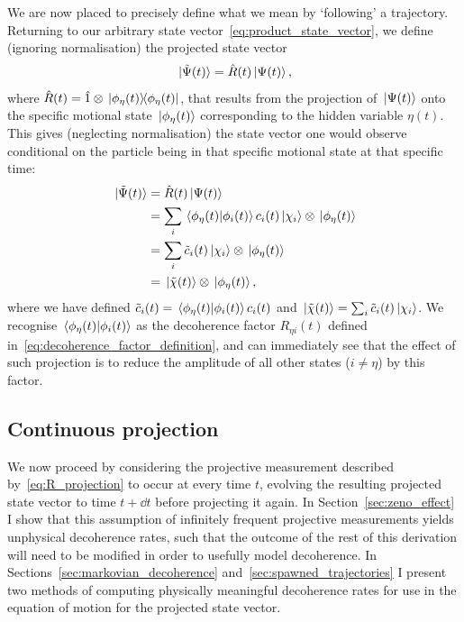 We are now placed to precisely define what we mean by `following' a trajectory.
Returning to our arbitrary state vector~\eqref{eq:product_state_vector}, we define (ignoring normalisation) the projected state vector
\begin{align}\label{eq:R_projection}
\ket{\tilde \Psi(t)} = \hat R(t)\ket{\Psi(t)},
\end{align}
where $\hat R(t) = \hat 1 \otimes \ketbra{\phi_\eta(t)}{\phi_\eta(t)}$, that results from the projection of $\ket{\Psi(t)}$ onto the specific motional state $\ket{\phi_\eta(t)}$ corresponding to the hidden variable $\eta(t)$. This gives (neglecting normalisation) the state vector one would observe conditional on the particle being in that specific motional state at that specific time:
\begin{align}
\ket{\tilde \Psi(t)} &= \hat R(t) \ket{\Psi(t)}\\
&= \sum_i\braket{\phi_\eta(t)}{\phi_i(t)}c_i(t)\ket{\chi_i}\otimes\ket{\phi_\eta(t)}\\
&= \sum_i\tilde c_i(t)\ket{\chi_i}\otimes\ket{\phi_\eta(t)}\\
&= \ket{\tilde \chi(t)}\otimes\ket{\phi_\eta(t)},
\end{align}
where we have defined $\tilde c_i(t) = \braket{\phi_\eta(t)}{\phi_i(t)}c_i(t)$ and $\ket{\tilde \chi(t)} = \sum_i \tilde c_i(t)\ket{\chi_i}$. We recognise $\braket{\phi_\eta(t)}{\phi_i(t)}$ as the decoherence factor $R_{\eta i}(t)$ defined in~\eqref{eq:decoherence_factor_definition}, and can immediately see that the effect of such projection is to reduce the amplitude of all other states ($i\neq\eta$) by this factor.

\subsection{Continuous projection}\label{sec:continuous_projection}
We now proceed by considering the projective measurement described by~\eqref{eq:R_projection} to occur at every time $t$, evolving the resulting projected state vector to time $t+\dd t$ before projecting it again. In Section~\ref{sec:zeno_effect} I show that this assumption of infinitely frequent projective measurements yields unphysical decoherence rates, such that the outcome of the rest of this derivation will need to be modified in order to usefully model decoherence. In Sections~\ref{sec:markovian_decoherence} and~\ref{sec:spawned_trajectories} I present two methods of computing physically meaningful decoherence rates for use in the equation of motion for the projected state vector.

